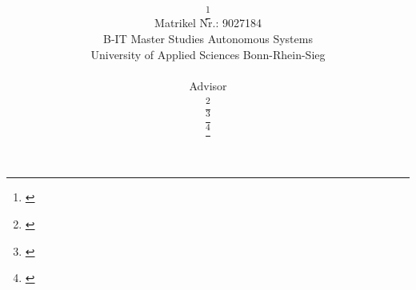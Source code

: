 \title{\PaperTitle\\\PaperSubject}
\author{\href{\PaperMainWriterEMail}{\PaperMainWriter \footnote{\href{mailto:\PaperMainWriterEMail} {\PaperMainWriterEMail}} 
}\\%
Matrikel Nr.: 9027184 \vspace{0.5cm} \\ 
B-IT Master Studies Autonomous Systems \vspace{0.5cm} \\
University of Applied Sciences Bonn-Rhein-Sieg\\ %
\vspace{0.7cm} \\ \setcounter{footnote}{6}
Advisor \\
\href{\PaperLecturerEMail}{\PaperLecturer \footnote{\href{mailto:\PaperLecturerEMail} {\PaperLecturerEMail}}} \\
\href{\PaperLecturerEMailSecond}{\PaperLecturerSecond \footnote{\href{mailto:\PaperLecturerEMailSecond} {\PaperLecturerEMailSecond}}} \\
\href{\PaperLecturerEMailThird}{\PaperLecturerThird \footnote{\href{mailto:\PaperLecturerEMailThird} {\PaperLecturerEMailThird}}} \\
}
\date{\PaperDate}
\maketitle

